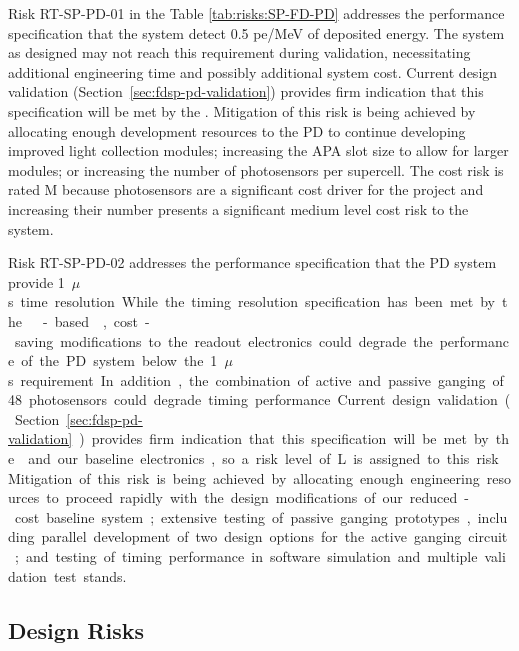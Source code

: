 Risk RT-SP-PD-01 in the Table \ref{tab:risks:SP-FD-PD} addresses the performance specification that the  system detect 0.5 pe/MeV of deposited energy.  The system as designed may not reach this requirement during validation, necessitating additional engineering time and possibly additional system cost.  Current design validation (Section~\ref{sec:fdsp-pd-validation}) 
provides firm indication that this specification will be met by the .  Mitigation of this risk is being achieved by allocating enough development resources to the PD to continue developing improved light collection modules; increasing the APA slot size to allow for larger modules; or increasing the number of photosensors per  supercell.  
The cost risk is rated M because photosensors are a significant cost driver for the project and increasing their number presents a significant medium level cost risk to the system.

Risk RT-SP-PD-02 addresses the performance specification that the PD system provide \SI{1}{$\mu$s} time resolution.  While the timing resolution specification has been met by the  -based ,  cost-saving modifications to the readout electronics could degrade the performance of the PD system below the \SI{1}{$\mu$s} requirement.  In addition, the combination of active and passive ganging of 48 photosensors could degrade timing performance.  Current design validation (Section~\ref{sec:fdsp-pd-validation}) provides firm indication that this specification will be met by the  and our baseline electronics, so a risk level of L is assigned to this risk.  Mitigation of this risk is being achieved by allocating enough engineering resources to proceed rapidly with the design modifications of our reduced-cost baseline system; extensive testing of passive ganging prototypes, including parallel development of two design options for the active ganging circuit; and testing of timing performance in software simulation and multiple validation test stands.


\subsection{Design Risks}

